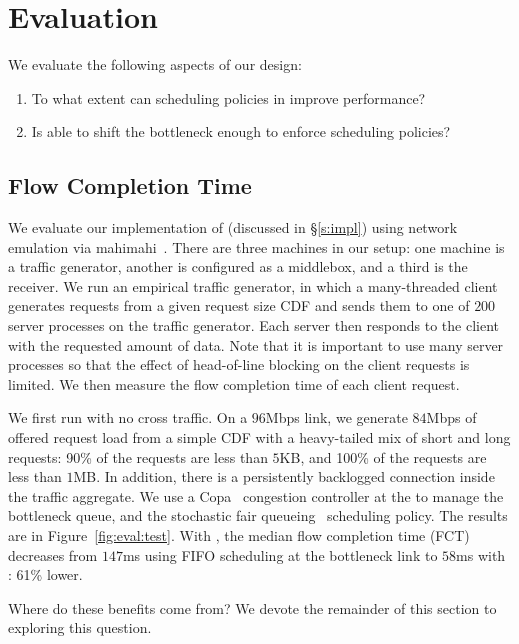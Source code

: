 \section{Evaluation}\label{s:eval}

We evaluate the following aspects of our design:
\begin{enumerate}
    \item To what extent can scheduling policies in \name improve performance?
    \item Is \name able to shift the bottleneck enough to enforce scheduling policies?
\end{enumerate}

\subsection{Flow Completion Time}\label{s:eval:fct}


We evaluate our implementation of \name (discussed in \S\ref{s:impl}) using network emulation via mahimahi~\cite{mahimahi}.
There are three machines in our setup: one machine is a traffic generator, another is configured as a middlebox, and a third is the receiver.
We run an empirical traffic generator, in which a many-threaded client generates requests from a given request size CDF and sends them to one of $200$ server processes on the traffic generator.
Each server then responds to the client with the requested amount of data.
Note that it is important to use many server processes so that the effect of head-of-line blocking on the client requests is limited.
We then measure the flow completion time of each client request.

We first run \name with no cross traffic.
On a $96$Mbps link, we generate $84$Mbps of offered request load from a simple CDF with a heavy-tailed mix of short and long requests: 90\% of the requests are less than $5$KB, and 100\% of the requests are less than $1$MB. 
In addition, there is a persistently backlogged connection inside the traffic aggregate.
We use a Copa~\cite{copa} congestion controller at the \inbox to manage the bottleneck queue, and the stochastic fair queueing~\cite{sfq} scheduling policy.
The results are in Figure~\ref{fig:eval:test}.
With \name, the median flow completion time (FCT) decreases from $147$ms using FIFO scheduling at the bottleneck link to $58$ms with \name: 61\% lower.

Where do these benefits come from? We devote the remainder of this section to exploring this question.

